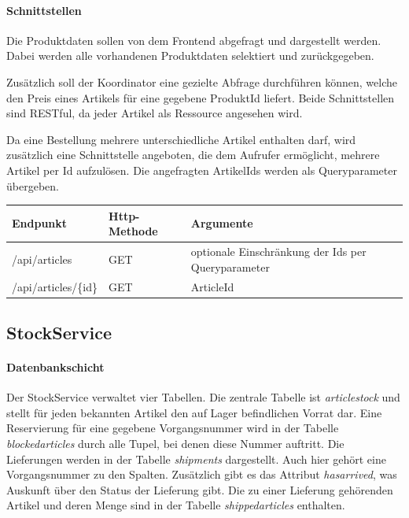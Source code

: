 \paragraph*{Schnittstellen} %
Die Produktdaten sollen von dem Frontend abgefragt und dargestellt werden. Dabei werden alle vorhandenen Produktdaten selektiert und zurückgegeben. 

Zusätzlich soll der Koordinator eine gezielte Abfrage durchführen können, welche den Preis eines Artikels für eine gegebene ProduktId liefert. Beide Schnittstellen sind RESTful, da jeder Artikel als Ressource angesehen wird. 

Da eine Bestellung mehrere unterschiedliche Artikel enthalten darf, wird zusätzlich eine Schnittstelle angeboten, die dem Aufrufer ermöglicht, mehrere Artikel per Id aufzulösen. Die angefragten ArtikelIds werden als Queryparameter übergeben.

\begin{center}
	\begin{tabular}[h]{|p{3.5cm}|p{3cm}|p{6cm}|}
		\hline
		Endpunkt & Http-Methode & Argumente \\ \hline
		/api/articles & GET & optionale Einschränkung der Ids per Queryparameter \\ \hline
		/api/articles/\{id\} & GET & ArticleId \\ \hline
	\end{tabular}
\end{center}
\FloatBarrier

\subsection{StockService}
\paragraph*{Datenbankschicht}

Der StockService verwaltet vier Tabellen. Die zentrale Tabelle ist \textit{articlestock} und stellt für jeden bekannten Artikel den auf Lager befindlichen Vorrat dar. Eine Reservierung für eine gegebene Vorgangsnummer wird in der Tabelle \textit{blockedarticles} durch alle Tupel, bei denen diese Nummer auftritt. Die Lieferungen werden in der Tabelle \textit{shipments} dargestellt. Auch hier gehört eine Vorgangsnummer zu den Spalten. Zusätzlich gibt es das Attribut \textit{hasarrived}, was Auskunft über den Status der Lieferung gibt. Die zu einer Lieferung gehörenden Artikel und deren Menge sind in der Tabelle \textit{shippedarticles} enthalten.

